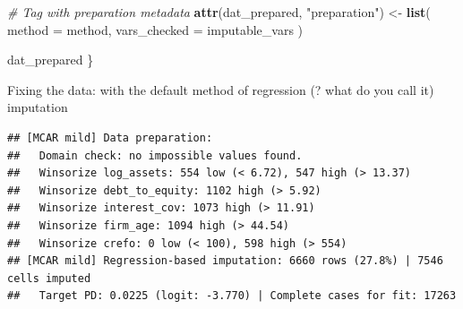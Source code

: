 \documentclass[
]{article}
\newenvironment{Shaded}{\begin{snugshade}}{\end{snugshade}}
\newcommand{\AttributeTok}[1]{\textcolor[rgb]{0.13,0.29,0.53}{#1}}
\newcommand{\CommentTok}[1]{\textcolor[rgb]{0.56,0.35,0.01}{\textit{#1}}}
\newcommand{\FunctionTok}[1]{\textcolor[rgb]{0.13,0.29,0.53}{\textbf{#1}}}
\newcommand{\NormalTok}[1]{#1}
\newcommand{\OtherTok}[1]{\textcolor[rgb]{0.56,0.35,0.01}{#1}}
\newcommand{\SpecialCharTok}[1]{\textcolor[rgb]{0.81,0.36,0.00}{\textbf{#1}}}
\newcommand{\StringTok}[1]{\textcolor[rgb]{0.31,0.60,0.02}{#1}}
\begin{document}
\begin{Shaded}
\begin{Highlighting}[]
  \CommentTok{\# Tag with preparation metadata}
  \FunctionTok{attr}\NormalTok{(dat\_prepared, }\StringTok{"preparation"}\NormalTok{) }\OtherTok{\textless{}{-}} \FunctionTok{list}\NormalTok{(}
    \AttributeTok{method =}\NormalTok{ method,}
    \AttributeTok{vars\_checked =}\NormalTok{ imputable\_vars}
\NormalTok{  )}
  
\NormalTok{  dat\_prepared}
\NormalTok{\}}
\end{Highlighting}
\end{Shaded}

Fixing the data: with the default method of regression (? what do you
call it) imputation

\begin{Shaded}
\end{Shaded}

\begin{verbatim}
## [MCAR mild] Data preparation:
##   Domain check: no impossible values found.
##   Winsorize log_assets: 554 low (< 6.72), 547 high (> 13.37)
##   Winsorize debt_to_equity: 1102 high (> 5.92)
##   Winsorize interest_cov: 1073 high (> 11.91)
##   Winsorize firm_age: 1094 high (> 44.54)
##   Winsorize crefo: 0 low (< 100), 598 high (> 554)
## [MCAR mild] Regression-based imputation: 6660 rows (27.8%) | 7546 cells imputed
##   Target PD: 0.0225 (logit: -3.770) | Complete cases for fit: 17263
\end{verbatim}

\begin{Shaded}
\end{Shaded}
\end{document}

